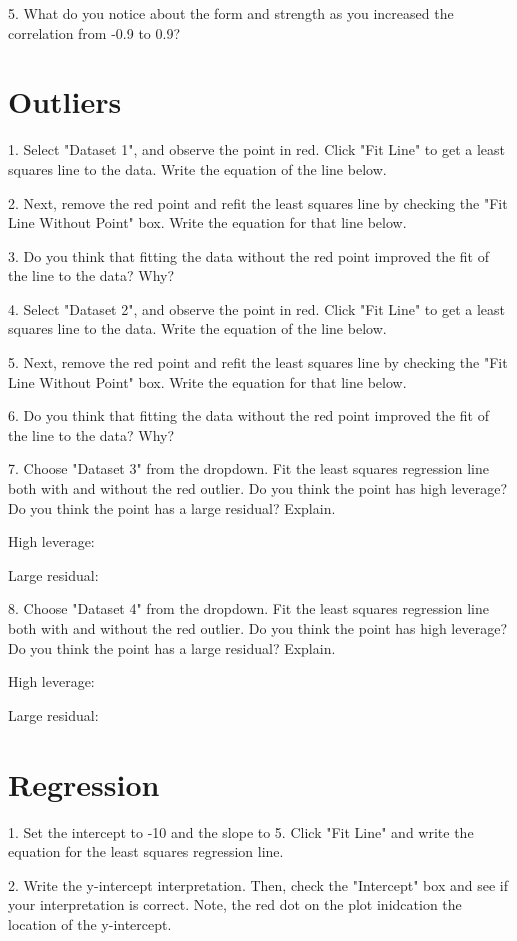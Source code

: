 \documentclass[11pt]{amsart}
\begin{document}
5. What do you notice about the form and strength as you increased the correlation from -0.9 to 0.9?

\section{Outliers}

1. Select "Dataset 1", and observe the point in red. Click "Fit Line" to get a least squares line to the data. Write the equation of the line below.

2. Next, remove the red point and refit the least squares line by checking the "Fit Line Without Point" box.  Write the equation for that line below. 

3. Do you think that fitting the data without the red point improved the fit of the line to the data? Why?

4. Select "Dataset 2", and observe the point in red. Click "Fit Line" to get a least squares line to the data. Write the equation of the line below.

5. Next, remove the red point and refit the least squares line by checking the "Fit Line Without Point" box.  Write the equation for that line below. 

6. Do you think that fitting the data without the red point improved the fit of the line to the data? Why?

7. Choose "Dataset 3" from the dropdown. Fit the least squares regression line both with and without the red outlier. Do you think the point has high leverage? Do you think the point has a large residual? Explain.

High leverage:

Large residual:

8. Choose "Dataset 4" from the dropdown. Fit the least squares regression line both with and without the red outlier. Do you think the point has high leverage? Do you think the point has a large residual? Explain.

High leverage:

Large residual:


\section{Regression}
1.  Set the intercept to -10 and the slope to 5. Click "Fit Line" and write the equation for the least squares regression line.

2. Write the y-intercept interpretation. Then, check the "Intercept" box and see if your interpretation is correct. Note, the red dot on the plot inidcation the location of the y-intercept.
\end{document}

